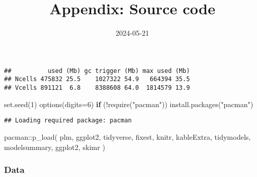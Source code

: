 \documentclass[
]{article}
\title{Appendix: Source code}
\author{}
\date{\vspace{-2.5em}2024-05-21}
\newenvironment{Shaded}{\begin{snugshade}}{\end{snugshade}}
\newcommand{\AttributeTok}[1]{\textcolor[rgb]{0.77,0.63,0.00}{#1}}
\newcommand{\ConstantTok}[1]{\textcolor[rgb]{0.00,0.00,0.00}{#1}}
\newcommand{\ControlFlowTok}[1]{\textcolor[rgb]{0.13,0.29,0.53}{\textbf{#1}}}
\newcommand{\DecValTok}[1]{\textcolor[rgb]{0.00,0.00,0.81}{#1}}
\newcommand{\FunctionTok}[1]{\textcolor[rgb]{0.00,0.00,0.00}{#1}}
\newcommand{\NormalTok}[1]{#1}
\newcommand{\SpecialCharTok}[1]{\textcolor[rgb]{0.00,0.00,0.00}{#1}}
\newcommand{\StringTok}[1]{\textcolor[rgb]{0.31,0.60,0.02}{#1}}
\begin{document}
\maketitle

\begin{Shaded}
\end{Shaded}

\begin{verbatim}
##          used (Mb) gc trigger (Mb) max used (Mb)
## Ncells 475832 25.5    1027322 54.9   664394 35.5
## Vcells 891121  6.8    8388608 64.0  1814579 13.9
\end{verbatim}

\begin{Shaded}
\begin{Highlighting}[]
\FunctionTok{set.seed}\NormalTok{(}\DecValTok{1}\NormalTok{)}
\FunctionTok{options}\NormalTok{(}\AttributeTok{digits=}\DecValTok{6}\NormalTok{) }
\ControlFlowTok{if}\NormalTok{ (}\SpecialCharTok{!}\FunctionTok{require}\NormalTok{(}\StringTok{"pacman"}\NormalTok{)) }\FunctionTok{install.packages}\NormalTok{(}\StringTok{"pacman"}\NormalTok{)}
\end{Highlighting}
\end{Shaded}

\begin{verbatim}
## Loading required package: pacman
\end{verbatim}

\begin{Shaded}
\begin{Highlighting}[]
\NormalTok{pacman}\SpecialCharTok{::}\FunctionTok{p\_load}\NormalTok{(}
\NormalTok{  plm,}
\NormalTok{  ggplot2,}
\NormalTok{  tidyverse,}
\NormalTok{  fixest,}
\NormalTok{  knitr,}
\NormalTok{  kableExtra,}
\NormalTok{  tidymodels,}
\NormalTok{  modelsummary,}
\NormalTok{  ggplot2,}
\NormalTok{  skimr}
\NormalTok{)}
\end{Highlighting}
\end{Shaded}

\hypertarget{data}{%
\subsubsection{Data}\label{data}}
\end{document}
